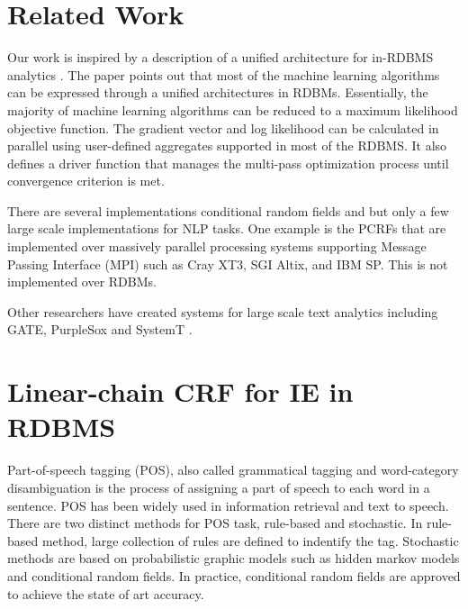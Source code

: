 \documentclass[11pt,letterpaper]{article}
\begin{document}
\section{Related Work}
Our work is inspired by a description of a unified architecture for in-RDBMS analytics \cite{Feng:2012:TUA:2213836.2213874}.
The paper points out that most of the machine learning algorithms can be expressed through
a unified architectures in RDBMs.
Essentially, the majority of machine learning algorithms can be reduced to a maximum likelihood objective function. %
The gradient vector and log likelihood can be calculated in parallel using user-defined aggregates supported in most of the RDBMS.
It also defines a driver function that manages the multi-pass optimization process until convergence criterion is met.

There are several implementations conditional random fields and but only a few 
large scale implementations for NLP tasks.
One example is the PCRFs \cite{phan2004flexcrfs} that are implemented over
massively parallel processing systems supporting Message Passing Interface (MPI) such as 
Cray XT3, SGI Altix, and IBM SP.
This is not implemented over RDBMs.

Other researchers have created systems for large scale text analytics including 
GATE, PurpleSox and SystemT
\cite{Cunningham2011a,Bohannon:2009:PSE:1519103.1519107,Li:2011:SDI:2002440.2002459}. 


\section{Linear-chain CRF for IE in RDBMS}
Part-of-speech tagging (POS), also called grammatical tagging and word-category disambiguation is the process of assigning 
a part of speech to each word in a sentence. POS has been widely used in information retrieval and text to speech. 
There are two distinct methods for 
POS task, rule-based and stochastic.
In rule-based method, large collection of rules are defined to indentify the tag. Stochastic methods are based on 
probabilistic graphic models such as hidden markov models and conditional random fields. In practice, 
conditional random fields are approved to achieve the state of art accuracy.
\end{document}
